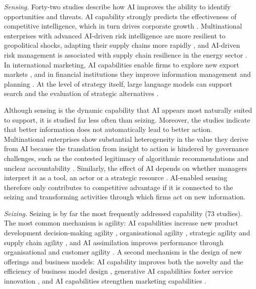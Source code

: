\emph{Sensing.} Forty-two studies describe how AI improves the ability to identify opportunities and threats. AI capability strongly predicts the effectiveness of competitive intelligence, which in turn drives corporate growth \parencite[6]{slrR103}. Multinational enterprises with advanced AI-driven risk intelligence are more resilient to geopolitical shocks, adapting their supply chains more rapidly \parencite[1]{slrR096}, and AI-driven risk management is associated with supply chain resilience in the energy sector \parencite[1]{slrR093}. In international marketing, AI capabilities enable firms to explore new export markets \parencite[1]{slrR081}, and in financial institutions they improve information management and planning \parencite[1]{slrR119}. At the level of strategy itself, large language models can support search and the evaluation of strategic alternatives \parencite[322]{slrR129}.

Although sensing is the dynamic capability that AI appears most naturally suited to support, it is studied far less often than seizing. Moreover, the studies indicate that better information does not automatically lead to better action. Multinational enterprises show substantial heterogeneity in the value they derive from AI because the translation from insight to action is hindered by governance challenges, such as the contested legitimacy of algorithmic recommendations and unclear accountability \parencite[1]{slrR008}. Similarly, the effect of AI depends on whether managers interpret it as a tool, an actor or a strategic resource \parencite[1]{wu2026}. AI-enabled sensing therefore only contributes to competitive advantage if it is connected to the seizing and transforming activities through which firms act on new information.

\emph{Seizing.} Seizing is by far the most frequently addressed capability (73 studies). The most common mechanism is agility: AI capabilities increase new product development decision-making agility \parencite[1]{slrR022}, organisational agility \parencites[1]{slrR030}[1]{slrR053}, strategic agility \parencite[3003]{slrR056} and supply chain agility \parencites[1]{slrR041}[1]{slrR108}, and AI assimilation improves performance through organisational and customer agility \parencite[1]{fossowamba2022}. A second mechanism is the design of new offerings and business models: AI capability improves both the novelty and the efficiency of business model design \parencite[1]{slrR083}, generative AI capabilities foster service innovation \parencite[10]{li2025}, and AI capabilities strengthen marketing capabilities \parencite[1]{slrR142}.

